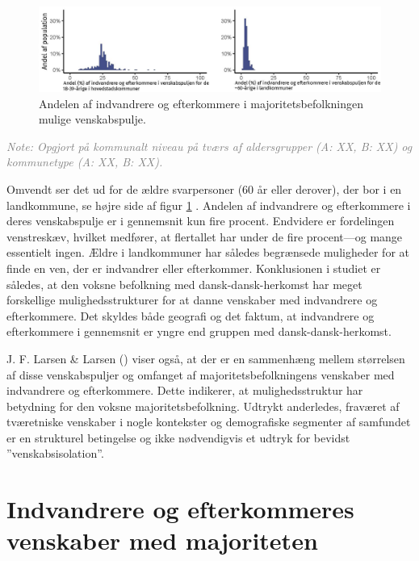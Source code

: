 \documentclass[
]{book}
\begin{document}
\newpage

\begin{figure}
\includegraphics[width=1\linewidth]{images/Figur_6_2} \caption{Andelen af indvandrere og efterkommere i majoritetsbefolkningen mulige venskabspulje.}\label{fig:fig-6-2}
\end{figure}

\begin{footnotesize}\textit{\textcolor{gray}{
Note: Opgjort på kommunalt niveau på tværs af aldersgrupper (A: XX, B: XX) og kommunetype (A: XX, B: XX).
}}
\end{footnotesize}

Omvendt ser det ud for de ældre svarpersoner (60 år eller derover), der bor i en landkommune, se højre side af figur \ref{fig:fig-6-2} . Andelen af indvandrere og efterkommere i deres venskabspulje er i gennemsnit kun fire procent. Endvidere er fordelingen venstreskæv, hvilket medfører, at flertallet har under de fire procent---og mange essentielt ingen. Ældre i landkommuner har således begrænsede muligheder for at finde en ven, der er indvandrer eller efterkommer. Konklusionen i studiet er således, at den voksne befolkning med dansk-dansk-herkomst har meget forskellige mulighedsstrukturer for at danne venskaber med indvandrere og efterkommere. Det skyldes både geografi og det faktum, at indvandrere og efterkommere i gennemsnit er yngre end gruppen med dansk-dansk-herkomst.

J. F. Larsen \& Larsen () viser også, at der er en sammenhæng mellem størrelsen af disse venskabspuljer og omfanget af majoritetsbefolkningens venskaber med indvandrere og efterkommere. Dette indikerer, at mulighedsstruktur har betydning for den voksne majoritetsbefolkning. Udtrykt anderledes, fraværet af tværetniske venskaber i nogle kontekster og demografiske segmenter af samfundet er en strukturel betingelse og ikke nødvendigvis et udtryk for bevidst ''venskabsisolation''.

\section{Indvandrere og efterkommeres venskaber med majoriteten}\label{indvandrere-og-efterkommeres-venskaber-med-majoriteten}
\end{document}
